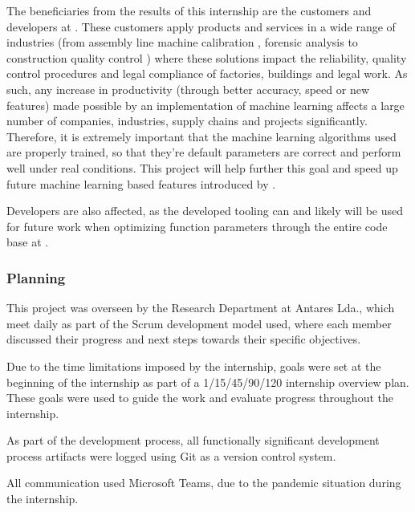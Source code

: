 The beneficiaries from the results of this internship are the customers and developers at \faro. These customers apply \faro products and services in a wide range of industries (from assembly line machine calibration \parencite{faro_man_eq_align}, forensic analysis \parencite{faro_forensic} to construction quality control \parencite{faro_construction}) where these solutions impact the reliability, quality control procedures and legal compliance of factories, buildings and legal work. As such, any increase in productivity (through better accuracy, speed or new features) made possible by an implementation of machine learning affects a large number of companies, industries, supply chains and projects significantly. Therefore, it is extremely important that the machine learning algorithms used are properly trained, so that they're default parameters are correct and perform well under real conditions. This project will help further this goal and speed up future machine learning based features introduced by \faro.

Developers are also affected, as the developed tooling can and likely will be used for future work when optimizing function parameters through the entire code base at \faro.

\subsubsection{Planning}

This project was overseen by the Research Department at Antares Lda., which meet daily as part of the Scrum development model used, where each member discussed their progress and next steps towards their specific objectives. 

Due to the time limitations imposed by the internship, goals were set at the beginning of the internship as part of a 1/15/45/90/120 internship overview plan. These goals were used to guide the work and evaluate progress throughout the internship.

As part of the development process, all functionally significant development process artifacts were logged using Git as a version control system.

All communication used Microsoft Teams, due to the pandemic situation during the internship.